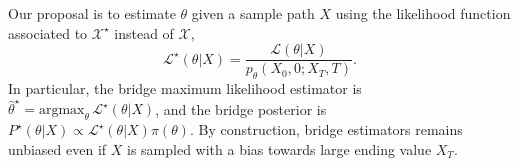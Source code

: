 \documentclass[%
 reprint,
groupedaddress,
 amsmath,amssymb,
 aps,
]{revtex4-2}
\begin{document}
Our proposal is to estimate $\theta$ given a sample path $X$ using the likelihood function associated to $\mathcal{X}^\star$ instead of $\mathcal{X}$,  
\begin{equation}
    \mathcal{L}^\star(\theta\vert X) = \frac{\mathcal{L}(\theta\vert X) }{p_\theta(X_0, 0; X_T, T)}.
\end{equation}
In particular, the bridge maximum likelihood estimator is $\widehat{\theta}^\star = \textrm{argmax}_\theta\, \mathcal{L}^\star(\theta\vert X)$, and the bridge posterior is $P^\star(\theta\vert X) \propto \mathcal{L}^\star(\theta\vert X)\pi(\theta)$. By construction, bridge estimators remains unbiased even if $X$ is sampled with a bias towards large ending value $X_T$. 
\end{document}
